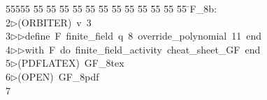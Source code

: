 %
%
\begin{tabbing}
55555 \= 55 \= 55 \= 55 \= 55 \= 55 \= 55 \= 55 \= 55 \= 55 \= 55 \= 55 \= 55 \= \>F\_8b:\\[0pt]
2\>$\triangleright$\>(ORBITER)\ v\ 3\ \\[0pt]
3\>$\triangleright$\>$\triangleright$\>define\ F\ finite\_field\ q\ 8\ override\_polynomial\ 11\ end\ \\[0pt]
4\>$\triangleright$\>$\triangleright$\>with\ F\ do\ finite\_field\_activity\ cheat\_sheet\_GF\ end\\[0pt]
5\>$\triangleright$\>(PDFLATEX)\ GF\_8tex\\[0pt]
6\>$\triangleright$\>(OPEN)\ GF\_8pdf\\[0pt]
7\>\end{tabbing}
